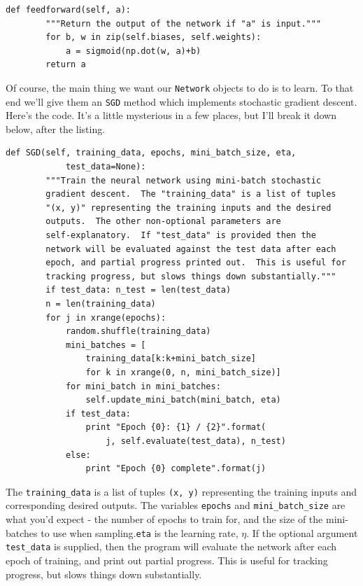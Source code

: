 \begin{lstlisting}
def feedforward(self, a):
        """Return the output of the network if "a" is input."""
        for b, w in zip(self.biases, self.weights):
            a = sigmoid(np.dot(w, a)+b)
        return a
\end{lstlisting}

Of course, the main thing we want our \texttt{Network} objects to do is to learn. To that end we'll give them an \texttt{SGD} method which implements stochastic gradient descent. Here's the code. It's a little mysterious in a few places, but I'll break it down below, after the listing.

\begin{lstlisting}
def SGD(self, training_data, epochs, mini_batch_size, eta,
            test_data=None):
        """Train the neural network using mini-batch stochastic
        gradient descent.  The "training_data" is a list of tuples
        "(x, y)" representing the training inputs and the desired
        outputs.  The other non-optional parameters are
        self-explanatory.  If "test_data" is provided then the
        network will be evaluated against the test data after each
        epoch, and partial progress printed out.  This is useful for
        tracking progress, but slows things down substantially."""
        if test_data: n_test = len(test_data)
        n = len(training_data)
        for j in xrange(epochs):
            random.shuffle(training_data)
            mini_batches = [
                training_data[k:k+mini_batch_size]
                for k in xrange(0, n, mini_batch_size)]
            for mini_batch in mini_batches:
                self.update_mini_batch(mini_batch, eta)
            if test_data:
                print "Epoch {0}: {1} / {2}".format(
                    j, self.evaluate(test_data), n_test)
            else:
                print "Epoch {0} complete".format(j)
\end{lstlisting}

The \texttt{training\_data} is a list of tuples \texttt{(x, y)} representing the training inputs and corresponding desired outputs. The variables \texttt{epochs} and \texttt{mini\_batch\_size} are what you'd expect - the number of epochs to train for, and the size of the mini-batches to use when sampling.\texttt{eta} is the learning rate, $\eta$. If the optional argument \texttt{test\_data} is supplied, then the program will evaluate the network after each epoch of training, and print out partial progress. This is useful for tracking progress, but slows things down substantially.\\


